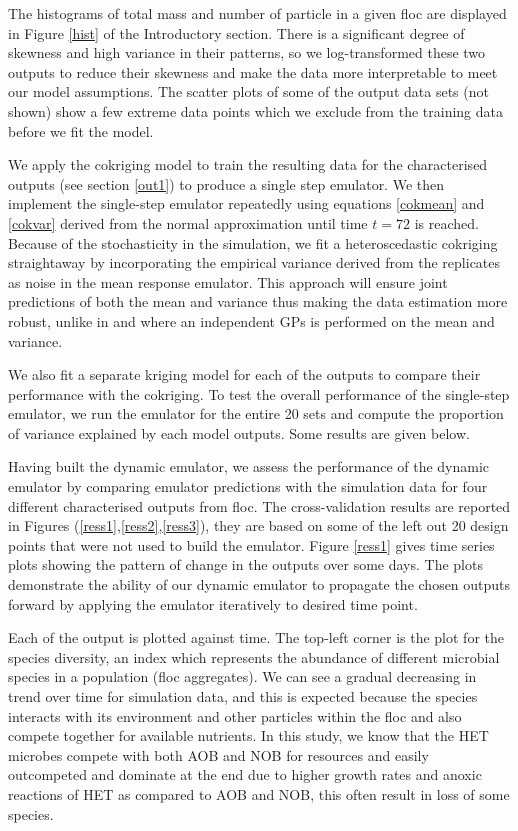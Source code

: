 The histograms of total mass and number of particle in a given floc are displayed in Figure \ref{hist} of the Introductory section. There is a significant degree of skewness and high variance in their patterns, so we log-transformed these two outputs to reduce their skewness and make the data more interpretable to meet our model assumptions. The scatter plots of some of the output data sets (not shown) show a few extreme data points which we exclude from the training data before we fit the model.

We apply the cokriging model to train the resulting data for the characterised outputs (see section \ref{out1}) to produce a single step emulator. We then implement the single-step emulator repeatedly using equations \ref{cokmean} and \ref{cokvar} derived from the normal approximation until time $t=72$ is reached. Because of the stochasticity in the simulation, we fit a heteroscedastic cokriging straightaway by incorporating the empirical variance derived from the replicates as noise in the mean response emulator. This approach will ensure joint predictions of both the mean and variance thus making the data estimation more robust, unlike in \citet{pd26} and \citet{pd22} where an independent GPs is performed on the mean and variance. 

We also fit a separate kriging model for each of the outputs to compare their performance with the cokriging. To test the overall performance of the single-step emulator, we run the emulator for the entire 20 sets and compute the proportion of variance explained by each model outputs. Some results are given below.

Having built the dynamic emulator, we assess the performance of the dynamic emulator by comparing emulator predictions with the simulation data for four different characterised outputs from floc. The cross-validation results are reported in Figures (\ref{ress1},\ref{ress2},\ref{ress3}), they are based on some of the left out 20 design points that were not used to build the emulator. Figure \ref{ress1} gives time series plots showing the pattern of change in the outputs over some days. The plots demonstrate the ability of our dynamic emulator to propagate the chosen outputs forward by applying the emulator iteratively to desired time point. 

Each of the output is plotted against time. The top-left corner is the plot for the species diversity, an index which represents the abundance of different microbial species in a population (floc aggregates). We can see a gradual decreasing in trend over time for simulation data, and this is expected because the species interacts with its environment and other particles within the floc and also compete together for available nutrients. In this study, we know that the HET microbes compete with both AOB and NOB for resources and easily outcompeted and dominate at the end due to higher growth rates and anoxic reactions of HET as compared to AOB and NOB, this often result in loss of some species. 

